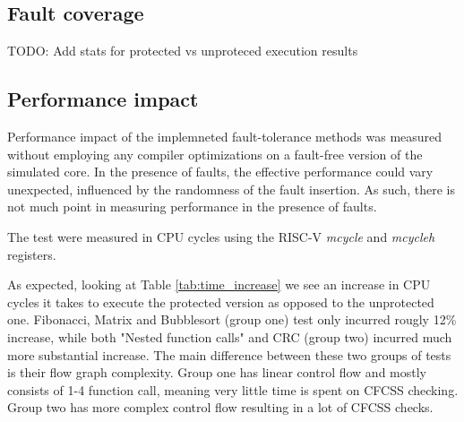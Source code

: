 \subsection{Fault coverage}

TODO: Add stats for protected vs unproteced execution results

\subsection{Performance impact}

Performance impact of the implemneted fault-tolerance methods was measured without employing any compiler optimizations on a fault-free version of the simulated core. In the presence of faults, the effective performance could vary unexpected, influenced by the randomness of the fault insertion. As such, there is not much point in measuring performance in the presence of faults.

The test were measured in CPU cycles using the RISC-V \textit{mcycle} and \textit{mcycleh} registers.

\begin{table}[h]
\centering
{}
\caption{Execution time comparison between unprotected and protected tests}
\label{tab:time_increase}
\end{table}

As expected, looking at Table \ref{tab:time_increase} we see an increase in CPU cycles it takes to execute the protected version as opposed to the unprotected one. Fibonacci, Matrix and Bubblesort (group one) test only incurred rougly 12\% increase, while both "Nested function calls" and CRC (group two) incurred much more substantial increase. The main difference between these two groups of tests is their flow graph complexity. Group one has linear control flow and mostly consists of 1-4 function call, meaning very little time is spent on CFCSS checking. Group two has more complex control flow resulting in a lot of CFCSS checks.

